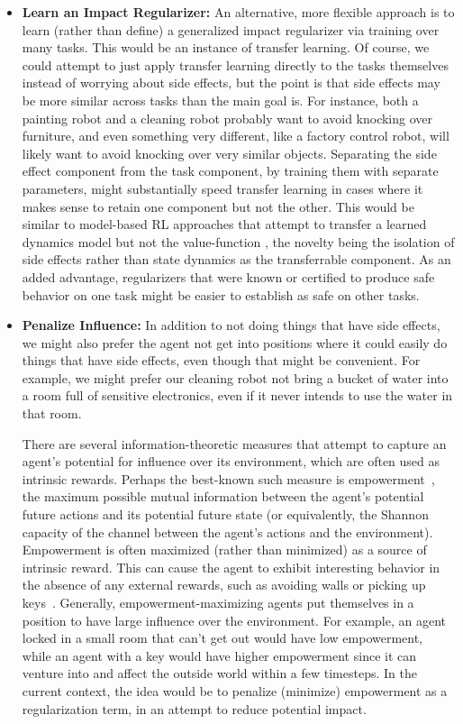 \documentclass[a4paper,10pt]{article}
\begin{document}
\begin{itemize}
\item {\bf Learn an Impact Regularizer:}  An alternative, more flexible approach is to learn (rather than define) a generalized impact regularizer via training over many tasks.  This would be an instance of transfer learning.  Of course, we could attempt to just apply transfer learning directly to the tasks themselves instead of worrying about side effects, but the point is that side effects may be more similar across tasks than the main goal is.  For instance, both a painting robot and a cleaning robot probably want to avoid knocking over furniture, and even something very different, like a factory control robot, will likely want to avoid knocking over very similar objects.  Separating the side effect component from the task component, by training them with separate parameters, might substantially speed transfer learning in cases where it makes sense to retain one component but not the other.  This would be similar to model-based RL approaches that attempt to transfer a learned dynamics model but not the value-function \cite{taylor2009transfer}, the novelty being the isolation of side effects rather than state dynamics as the transferrable component.  As an added advantage, regularizers that were known or certified to produce safe behavior on one task might be easier to establish as safe on other tasks.

\item {\bf Penalize Influence:} In addition to not doing things that have side effects, we might also prefer the agent not get into positions where it could easily do things that have side effects, even though that might be convenient. For example, we might prefer our cleaning robot not bring a bucket of water into a room full of sensitive electronics, even if it never intends to use the water in that room.  

There are several information-theoretic measures that attempt to capture an agent’s potential for influence over its environment, which are often used as intrinsic rewards.  Perhaps the best-known such measure is empowerment~\cite{salge2014empowerment}, the maximum possible mutual information between the agent’s potential future actions and its potential future state (or equivalently, the Shannon capacity of the channel between the agent’s actions and the environment). Empowerment is often maximized (rather than minimized) as a source of intrinsic reward.  This can cause the agent to exhibit interesting behavior in the absence of any external rewards, such as avoiding walls or picking up keys~\cite{mohamed2015variational}.  Generally, empowerment-maximizing agents put themselves in a position to have large influence over the environment.  For example, an agent locked in a small room that can’t get out would have low empowerment, while an agent with a key would have higher empowerment since it can venture into and affect the outside world within a few timesteps.  In the current context, the idea would be to penalize (minimize) empowerment as a regularization term, in an attempt to reduce potential impact.


\end{itemize}
\end{document}
